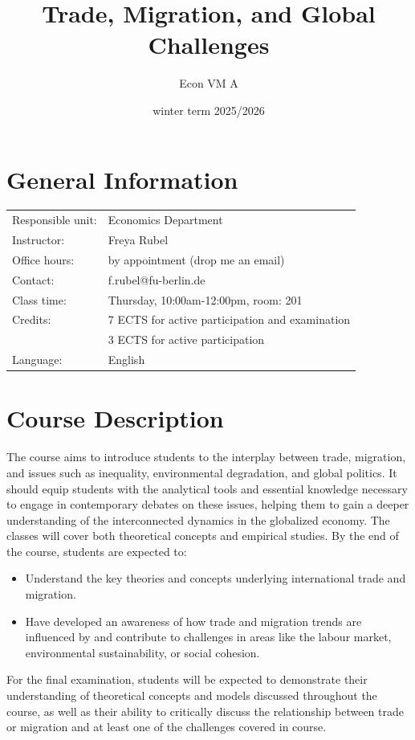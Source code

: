 \documentclass{article}
\title{Trade, Migration, and Global Challenges}
\author{Econ VM A}
\date{winter term 2025/2026}
\begin{document}
\maketitle
\thispagestyle{empty}

\section*{General Information}
\begin{tabular}{@{}ll}
Responsible unit:  & Economics Department \\
Instructor:          & Freya Rubel \\
Office hours: & by appointment (drop me an email)\\
Contact:           & f.rubel@fu-berlin.de \\
Class time:    & Thursday, 10:00am-12:00pm, room: 201 \\
Credits:          & 7 ECTS for active participation and examination \\
& 3 ECTS for active participation\\
Language:       & English \\
\end{tabular}

\section*{Course Description}
The course aims to introduce students to the interplay between trade, migration, and issues such as inequality, environmental degradation, and global politics. It should equip students with the analytical tools and essential knowledge necessary to engage in contemporary debates on these issues, helping them to gain a deeper understanding of the interconnected dynamics in the globalized economy. The classes will cover both theoretical concepts and empirical studies. By the end of the course, students are expected to:
\begin{itemize}
    \item Understand the key theories and concepts underlying international trade and migration.
    \item Have developed an awareness of how trade and migration trends are influenced by and contribute to challenges in areas like the labour market, environmental sustainability, or social cohesion.
\end{itemize}
For the final examination, students will be expected to demonstrate their understanding of theoretical concepts and models discussed throughout the course, as well as their ability to critically discuss the relationship between trade or migration and at least one of the challenges covered in course.
\end{document}
